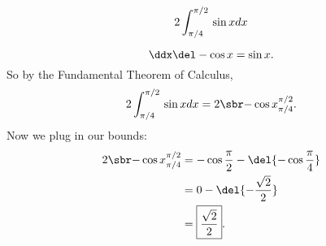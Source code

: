 \renewcommand{\avibounds}{_{\pi / 4}^{\pi / 2}}
\renewcommand{\avifn}{\sin x}
\renewcommand{\avianti}{-\cos x}

\begin{probboxed}
    \[
        \aviprob{}
    \]
\end{probboxed}

\avirecall
\[
    \ddx\del\avianti{} = \avifn{}.
\]
So by the Fundamental Theorem of Calculus,
\[
    \aviprob{}
    = \avibounded{}.
\]
Now we plug in our bounds:
\begin{align*}
    \avibounded{}
    &= -\cos\frac{\pi}{2} - \del{-\cos\frac{\pi}{4}} \\
    &= 0 -\del{-\frac{\sqrt{2}}{2}} \\
    &= \boxed{\frac{\sqrt{2}}{2}}.
\end{align*}
